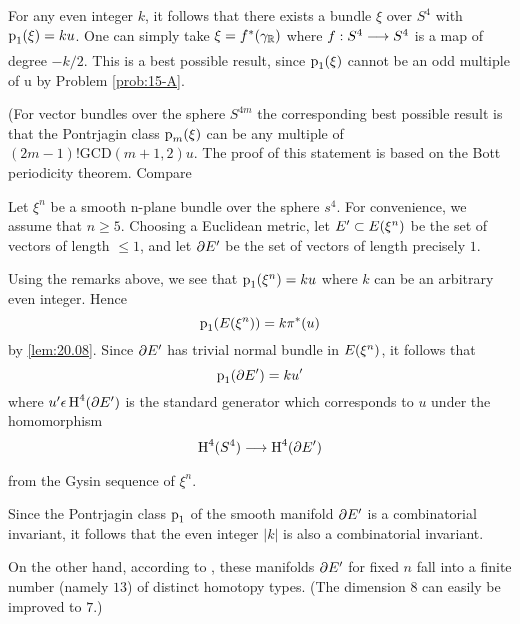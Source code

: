 \documentclass[../main]{subfiles}
\begin{document}
For any even integer $k$, it follows that there exists a bundle $\xi$ over $S^{4}$ with $\operatorname{p}_{1}(\xi)=ku$. One can simply take $\xi=f^{*}(\gamma_{\mathbb{R}})$ where $f: S^{4} \varrightarrow{} S^{4}$ is a map of degree $-k / 2$. This is a best possible result, since $\operatorname{p}_{1}(\xi)$ cannot be an odd multiple of u by Problem \ref{prob:15-A}.

(For vector bundles over the sphere $S^{4 m}$ the corresponding best possible result is that the Pontrjagin class $\operatorname{p}_{m}(\xi)$ can be any multiple of \newline $(2m-1)!\mathrm{GCD}(m+1,2) u$. The proof of this statement is based on the Bott periodicity theorem. Compare \cite{bott1970}
\setcounter{example}{0}

\begin{example}
Let $\xi^{n}$ be a smooth n-plane bundle over the sphere $s^{4}$. For convenience, we assume that $n \geq 5$. Choosing a Euclidean metric, let $E^{\prime} \subset E(\xi^{n})$ be the set of vectors of length $\leq 1$, and let $\partial E^{\prime}$ be the set of vectors of length precisely $1 .$
\end{example} 

Using the remarks above, we see that $\operatorname{p}_{1}(\xi^{n})=ku$ where $k$ can be an arbitrary even integer. Hence
\[
\operatorname{p}_{1}(E(\xi^{n}))=k \pi^{*}(u)
\]
by \ref{lem:20.08}. Since $\partial E^{\prime}$ has trivial normal bundle in $E(\xi^{n})$, it follows that
\[
\operatorname{p}_{1}(\partial E^{\prime})=ku^{\prime}
\]
where $u^{\prime} \epsilon \operatorname{H}^{4}(\partial E^{\prime})$ is the standard generator which corresponds to $u$ under the homomorphism
\[
\homology^{4}(S^{4}) \varrightarrow{} \homology^{4}(\partial \total^{\prime})
\]
from the Gysin sequence of $\xi^{n}$.

Since the Pontrjagin class $\operatorname{p}_{1}$ of the smooth manifold $\partial E^{\prime}$ is a combinatorial invariant, it follows that the even integer $|k|$ is also a combinatorial invariant. 

On the other hand, according to \cite{james1954}, these manifolds $\partial E^{\prime}$ for fixed $n$ fall into a finite number (namely $13$) of distinct homotopy types.  (The dimension $8$ can easily be improved to $7$.)
\end{document}

